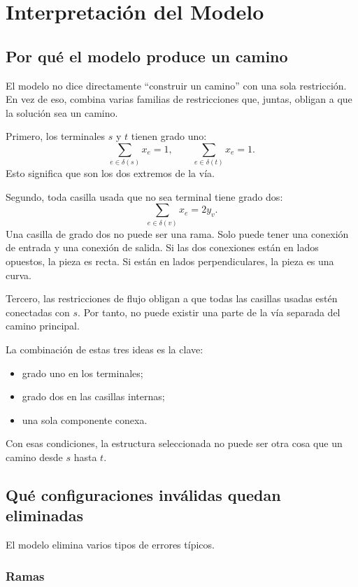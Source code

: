 \section{Interpretación del Modelo}
\label{sec:interpretacion-modelo}

\subsection{Por qué el modelo produce un camino}

El modelo no dice directamente ``construir un camino'' con una sola restricción. En vez de eso, combina varias familias de restricciones que, juntas, obligan a que la solución sea un camino.

Primero, los terminales \(s\) y \(t\) tienen grado uno:
\[
    \sum_{e \in \delta(s)} x_e = 1,
    \qquad
    \sum_{e \in \delta(t)} x_e = 1.
\]
Esto significa que son los dos extremos de la vía.

Segundo, toda casilla usada que no sea terminal tiene grado dos:
\[
    \sum_{e \in \delta(v)} x_e = 2y_v.
\]
Una casilla de grado dos no puede ser una rama. Solo puede tener una conexión de entrada y una conexión de salida. Si las dos conexiones están en lados opuestos, la pieza es recta. Si están en lados perpendiculares, la pieza es una curva.

Tercero, las restricciones de flujo obligan a que todas las casillas usadas estén conectadas con \(s\). Por tanto, no puede existir una parte de la vía separada del camino principal.

La combinación de estas tres ideas es la clave:
\begin{itemize}[leftmargin=2em]
    \item grado uno en los terminales;
    \item grado dos en las casillas internas;
    \item una sola componente conexa.
\end{itemize}
Con esas condiciones, la estructura seleccionada no puede ser otra cosa que un camino desde \(s\) hasta \(t\).

\subsection{Qué configuraciones inválidas quedan eliminadas}

El modelo elimina varios tipos de errores típicos.

\subsubsection{Ramas}

